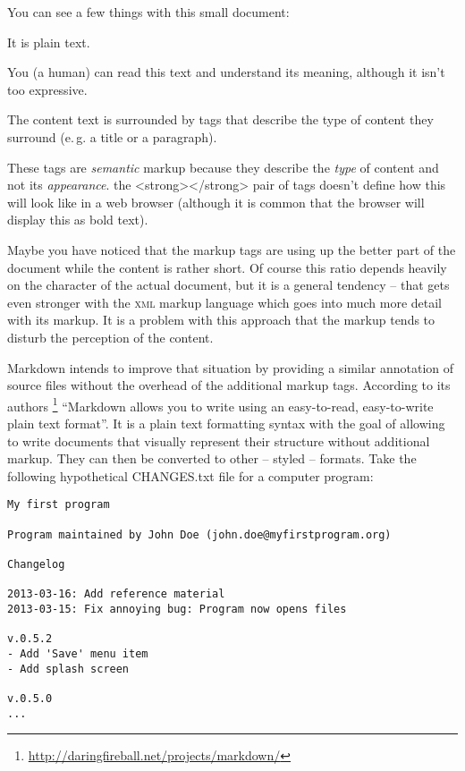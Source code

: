 \documentclass[../../LilyPond-Tutorials]{subfiles}
\begin{document}
You can see a few things with this small document:
\begin{itemize*}
    \item It is plain text.
    \item You (a human) can read this text and understand its meaning, although it isn't too expressive.
    \item The content text is surrounded by tags that describe the type of content they surround (e.\,g. a title or a paragraph).
    \item These tags are \emph{semantic} markup because they describe the \emph{type} of content and not its \emph{appearance}.
    the <strong></strong> pair of tags doesn't define how this will look like in a web browser (although it is common that the browser will display this as bold text).
\end{itemize*}

Maybe you have noticed that the markup tags are using up the better part of the document while the content is rather short.
Of course this ratio depends heavily on the character of the actual document, but it is a general tendency -- that gets even stronger with the \textsc{xml} markup language which goes into much more detail with its markup.
It is a problem with this approach that the markup tends to disturb the perception of the content.

Markdown intends to improve that situation by providing a similar annotation of source files without the overhead of the additional markup tags.
According to its authors%
\footnote{\url{http://daringfireball.net/projects/markdown/}}
“Markdown allows you to write using an easy-to-read, easy-to-write plain text format”.
It is a plain text formatting syntax with the goal of allowing to write documents that visually represent their structure without additional markup.
They can then be converted to other -- styled -- formats.
Take the following hypothetical CHANGES.txt file for a computer program:
\begin{lstlisting}[frame=single]
My first program

Program maintained by John Doe (john.doe@myfirstprogram.org)

Changelog

2013-03-16: Add reference material
2013-03-15: Fix annoying bug: Program now opens files

v.0.5.2
- Add 'Save' menu item
- Add splash screen

v.0.5.0
...
\end{lstlisting}
\end{document}
